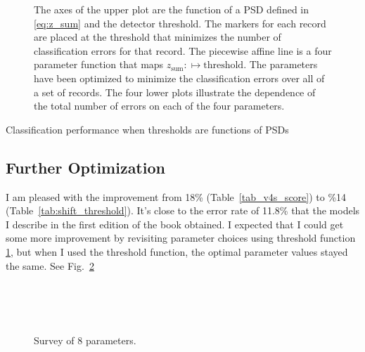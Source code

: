 \documentclass[12pt]{article}
\begin{document}
\begin{figure}
  \centering
  \caption[A function of PSDs for varying detector thresholds.]{The
    axes of the upper plot are the function of a PSD defined in
    \eqref{eq:z_sum} and the detector threshold.  The markers for each
    record are placed at the threshold that minimizes the number of
    classification errors for that record.  The piecewise affine line
    is a four parameter function that maps
    $z_{\text{sum}}: \mapsto \text{threshold}$.  The parameters have
    been optimized to minimize the classification errors over all of a
    set of records.  The four lower plots illustrate the dependence of
    the total number of errors on each of the four parameters.  }
  \label{fig:shift_threshold}
\end{figure}

\begin{table*}
  \centering
  
  \caption[Performance]{Classification performance when thresholds are
  functions of PSDs}
  \label{tab:abcd_score}
\end{table*}

\clearpage

\subsection{Further Optimization}
\label{sec:further}

I am pleased with the improvement from 18\%
(Table~\ref{tab_v4s_score}) to \%14 (Table~\ref{tab:shift_threshold}).
It's close to the error rate of 11.8\% that the models I describe in
the first edition of the book obtained.  I expected that I could get
some more improvement by revisiting parameter choices using threshold
function \ref{fig:shift_threshold}, but when I used the threshold
function, the optimal parameter values stayed the same.  See
Fig.~\ref{fig:abcd}

\begin{figure}
  \centering
  \\
  \\
  \\
  \caption[Parameter sensitivity with variable thresholds.]{Survey of
    8 parameters.}
  \label{fig:abcd}
\end{figure}
\end{document}
